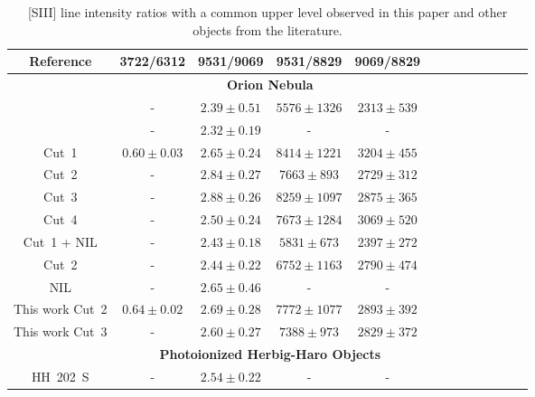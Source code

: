 \documentclass[fleqn,usenatbib]{mnras}
\begin{document}
\begin{table}
\centering
\caption{[S\thinspace III] line intensity ratios with a common upper level observed in this paper and other objects from the literature.}
\label{tab:atomic_data_test}
\begin{tabular}{ccccccccccccc}
\hline
Reference & 3722/6312 & 9531/9069 & 9531/8829 &9069/8829 \\
\hline

 & \multicolumn{4}{c}{{\bf Orion Nebula}}\\

\citet{Esteban04} & - & $2.39 \pm 0.51$ & $5576 \pm 1326$ & $2313 \pm 539$\\

\citet{mesadelgado09} & - & $2.32 \pm 0.19$ & - & - \\

\citet{mendez2021} Cut~1 & $0.60 \pm 0.03$ & $2.65 \pm 0.24$ & $8414 \pm 1221$ & $3204 \pm 455$\\

\citet{mendez2021} Cut~2 & - &$2.84 \pm 0.27$ & $7663 \pm 893$& $2729 \pm 312$\\

\citet{mendez2021} Cut~3 & - &$2.88 \pm 0.26$&$8259 \pm 1097$&$2875 \pm 365$\\

\citet{mendez2021} Cut~4 & - &$2.50 \pm 0.24$&$7673 \pm 1284$ & $3069 \pm 520$ \\

 
\citet{mendez2021-2} Cut~1 + NIL & - & $2.43 \pm 0.18$ &$5831 \pm 673$&$2397 \pm 272$ \\

\citet{mendez2021-2} Cut~2 & - & $2.44 \pm 0.22$ & $6752\pm 1163$& $2790 \pm 474$ \\

\citet{mendez2021-2} NIL & - &$2.65 \pm 0.46$ &-&- \\

This work Cut~2 & $0.64 \pm 0.02$ & $2.69 \pm 0.28$ & $7772 \pm 1077$ & $2893 \pm 392$\\


This work Cut~3 & - & $2.60 \pm 0.27$ & $7388 \pm 973$ & $2829 \pm 372$\\


& \multicolumn{4}{c}{{\bf Photoionized Herbig-Haro Objects}}\\

\citet{mesadelgado09} HH~202~S & - & $2.54 \pm 0.22$ & -&-\\


\end{tabular}
\end{table}
\end{document}
